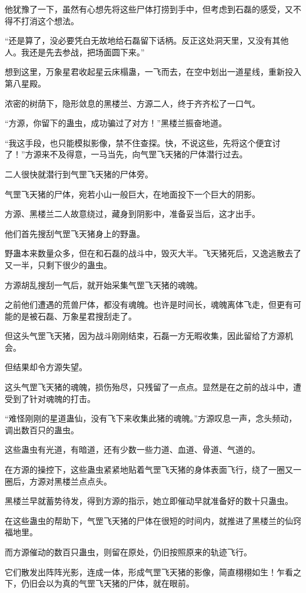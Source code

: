 \begin{this_body}
他犹豫了一下，虽然有心想先将这些尸体打捞到手中，但考虑到石磊的感受，又不得不打消这个想法。

“还是算了，没必要凭白无故地给石磊留下话柄。反正这处洞天里，又没有其他人。我还是先去参战，把场面圆下来。”

想到这里，万象星君收起星云床榻蛊，一飞而去，在空中划出一道星线，重新投入第八星殿。

浓密的树荫下，隐形敛息的黑楼兰、方源二人，终于齐齐松了一口气。

“方源，你留下的蛊虫，成功骗过了对方！”黑楼兰振奋地道。

“我这手段，也只能模拟影像，禁不住查探。快，不说这些，先将这个便宜讨了！”方源来不及得意，一马当先，向气罡飞天猪的尸体潜行过去。

二人很快就潜行到气罡飞天猪的尸体旁。

气罡飞天猪的尸体，宛若小山一般巨大，在地面投下一个巨大的阴影。

方源、黑楼兰二人故意绕过，藏身到阴影中，准备妥当后，这才出手。

他们首先搜刮气罡飞天猪身上的野蛊。

野蛊本来数量众多，但在和石磊的战斗中，毁灭大半。飞天猪死后，又逸逃散去了又一半，只剩下很少的蛊虫。

方源胡乱搜刮一气后，就开始采集气罡飞天猪的魂魄。

之前他们遭遇的荒兽尸体，都没有魂魄。也许是时间长，魂魄离体飞走，但更有可能的是被石磊、万象星君搜刮走了。

但这头气罡飞天猪，因为战斗刚刚结束，石磊一方无暇收集，因此留给了方源机会。

但结果却令方源失望。

这头气罡飞天猪的魂魄，损伤殆尽，只残留了一点点。显然是在之前的战斗中，遭受到了针对魂魄的打击。

“难怪刚刚的星道蛊仙，没有飞下来收集此猪的魂魄。”方源叹息一声，念头频动，调出数百只的蛊虫。

这些蛊虫有光道，有暗道，还有少数一些力道、血道、骨道、气道的。

在方源的操控下，这些蛊虫紧紧地贴着气罡飞天猪的身体表面飞行，绕了一圈又一圈后，方源对黑楼兰点点头。

黑楼兰早就蓄势待发，得到方源的指示，她立即催动早就准备好的数十只蛊虫。

在这些蛊虫的帮助下，气罡飞天猪的尸体在很短的时间内，就推进了黑楼兰的仙窍福地里。

而方源催动的数百只蛊虫，则留在原处，仍旧按照原来的轨迹飞行。

它们散发出阵阵光影，连成一体，形成气罡飞天猪的影像，简直栩栩如生！乍看之下，仍旧会以为真的气罡飞天猪的尸体，就在眼前。


\end{this_body}
